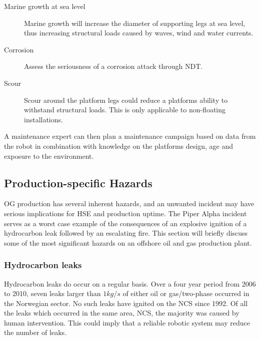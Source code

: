 \begin{description}
\item[Marine growth at sea level] Marine growth will increase the diameter of supporting legs at sea level, thus increasing structural loads caused by waves, wind and water currents. 
\item[Corrosion] Assess the seriousness of a corrosion attack through \ac{NDT}.
\item[Scour] Scour around the platform legs could reduce a platforms ability to withstand structural loads. This is only applicable to non-floating installations.
\end{description}

A maintenance expert can then plan a maintenance campaign based on data from the robot in combination with knowledge on the platforms design, age and exposure to the environment.

\subsection{Production-specific Hazards}

\ac{OG} production has several inherent hazards, and an unwanted incident may have serious implications for \ac{HSE} and production uptime. The Piper Alpha incident serves as a worst case example of the consequences of an explosive ignition of a hydrocarbon leak followed by an escalating fire. This section will briefly discuss some of the most significant hazards on an offshore oil and gas production plant.




\subsubsection{Hydrocarbon leaks}

Hydrocarbon leaks do occur on a regular basis. Over a four year period from 2006 to 2010, seven leaks larger than $1 kg/s$ of either oil or gas/two-phase occurred in the Norwegian sector. No such leaks have ignited on the \ac{NCS} since 1992. Of all the leaks which occurred in the same area, \ac{NCS}, the majority was caused by human intervention\cite{Vinnem2014}. This could imply that a reliable robotic system may reduce the number of leaks.

